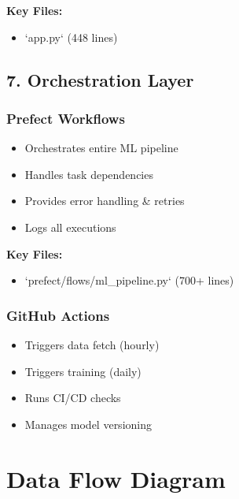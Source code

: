\textbf{Key Files:}
\begin{itemize}
    \item `app.py` (448 lines)
\end{itemize}

\subsection{7. Orchestration Layer}

\subsubsection{Prefect Workflows}
\begin{itemize}
    \item Orchestrates entire ML pipeline
    \item Handles task dependencies
    \item Provides error handling \& retries
    \item Logs all executions
\end{itemize}

\textbf{Key Files:}
\begin{itemize}
    \item `prefect/flows/ml\_pipeline.py` (700+ lines)
\end{itemize}

\subsubsection{GitHub Actions}
\begin{itemize}
    \item Triggers data fetch (hourly)
    \item Triggers training (daily)
    \item Runs CI/CD checks
    \item Manages model versioning
\end{itemize}

\section{Data Flow Diagram}

